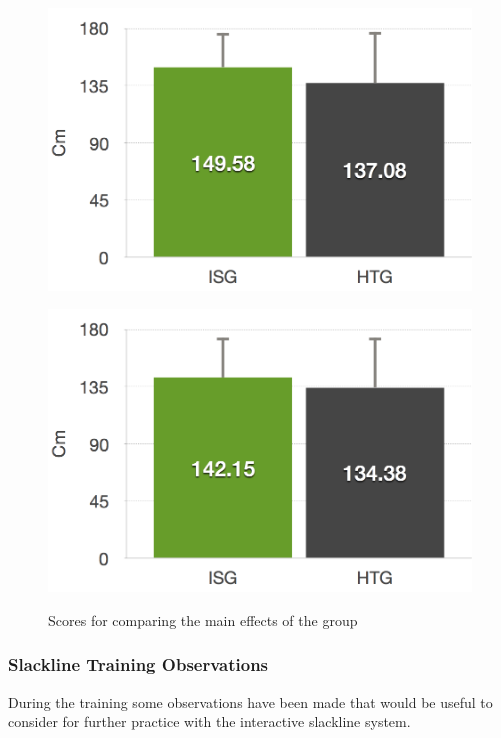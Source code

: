 \begin{figure}[htb]
\begin{minipage}[t]{0.40\linewidth}
		\includegraphics[width=1\linewidth]{Pictures/6_4_DIA_DistanceLeftGroupEffect}
		\label{fig:6_4_distanceLeftGroupEffect}
	\end{minipage}
	\hfill
	\begin{minipage}[t]{0.40\linewidth}
		\centering
		\includegraphics[width=1\linewidth]{Pictures/6_4_DIA_DistanceRightGroupEffect}
		\label{fig:6_4_distanceRightGroupEffect}
	\end{minipage}
	\caption{Scores for comparing the main effects of the group}
	\label{fig:6_4_mainEffectGroup}
\end{figure}

\subsubsection{Slackline Training Observations}\label{6_4_slacklineObservations}
During the training some observations have been made that would be useful to consider for further practice with the interactive slackline system.

